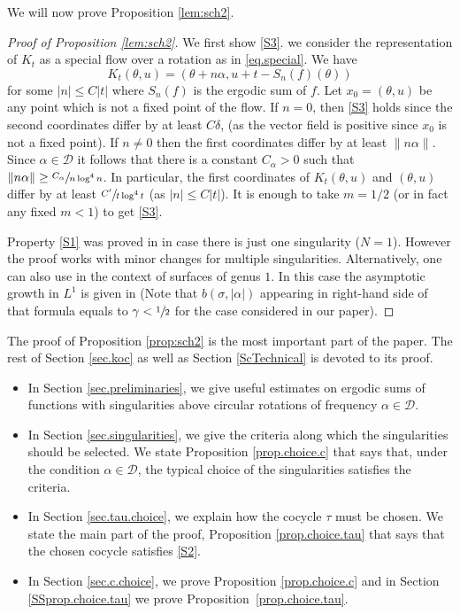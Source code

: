 \documentclass[10pt]{amsart}
\newcommand\cD{\mathcal{D}}
\theoremstyle{definition}
\theoremstyle{plain}
\begin{document}
We will now prove Proposition \ref{lem:sch2}.
\begin{proof}[Proof of Proposition \ref{lem:sch2}] We first show \eqref{S3}. we consider the representation of $K_t$ as a special flow over a rotation as in \eqref{eq.special}.
We have
\[
K_t(\theta, u)=(\theta+n\alpha, u+t-S_n(f)(\theta))
\]
for some $|n|\leq C |t|$ where $S_n(f)$ is the ergodic sum of $f$. Let $x_0=(\theta,u)$ be any point which is not a fixed point of the flow.
If $n=0$, then \eqref{S3} holds since the second coordinates differ by at least $C\delta$, (as the vector field is positive since $x_0$ is not a fixed point).
{ If $n\neq 0$ then the first coordinates differ by at least $\|n\alpha\|$. Since $\alpha\in \cD$ it follows that there is a constant $C_\alpha>0$ such that $\|n\alpha\|\geq \sfrac{C_\alpha}{n \log^4 n}$. In particular, the first coordinates of $K_t(\theta,u)$ and $(\theta,u)$ differ by at least $\sfrac{C'}{t \log^4 t}$ (as $|n|\leq C|t|$). It is enough to take $m=1/2$ (or in fact any fixed $m<1$) to get \eqref{S3}.}

Property \eqref{S1} was proved in \cite{DDKN} in case there is just one singularity (\ie $N=1$). However the proof works with minor changes for multiple singularities. Alternatively, one can also use \cite[Th.\,1.1]{FM} in the context of surfaces of genus $1$. In this case the asymptotic growth in $L^1$ is given in \cite[Eq.\,(1.5)]{FM} ({Note that $b(\sigma,|\alpha|)$ appearing in right-hand side of that formula
equals to $\gamma<\sfrac{1}{2}$ for the case considered in our paper}).
\end{proof}

The proof of Proposition \ref{prop:sch2} is the most important part of the paper. The rest of Section \ref{sec.koc} as well as Section \ref{ScTechnical} is devoted to its proof.

\begin{itemize}
\item
In Section \ref{sec.preliminaries}, we give useful estimates on ergodic sums of functions with singularities above circular rotations of frequency $\alpha \in \cD$.

\item
In Section \ref{sec.singularities}, we give the criteria along which the singularities should be selected. We state Proposition \ref{prop.choice.c} that says that, under the condition $\alpha \in \cD$, the typical choice of the singularities satisfies the criteria.

\item
In Section \ref{sec.tau.choice}, we explain how the cocycle $\tau$ must be chosen. We state the main part of the proof, Proposition \ref{prop.choice.tau} that says that the chosen cocycle satisfies \eqref{S2}.

\item
In Section \ref{sec.c.choice}, we prove Proposition \ref{prop.choice.c} and in Section \ref{SSprop.choice.tau} we prove Proposition~\ref{prop.choice.tau}.
\end{itemize}
\end{document}
